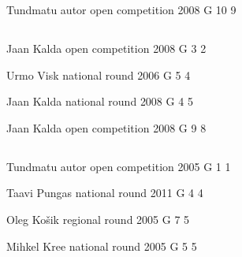 \documentclass[11pt]{article}
\begin{document}
\ylDisplay{} %
{Tundmatu autor} %
{open competition} %
{2008} %
{G 10} %
{9} %
{

\ifEngStatement
\fi
}
\newpage\subsection{\protect{}}

\ylDisplay{} %
{Jaan Kalda} %
{open competition} %
{2008} %
{G 3} %
{2} %
{

\ifEngStatement
\fi
}

\ylDisplay{} %
{Urmo Visk} %
{national round} %
{2006} %
{G 5} %
{4} %
{

\ifEngStatement
\fi
}

\ylDisplay{} %
{Jaan Kalda} %
{national round} %
{2008} %
{G 4} %
{5} %
{

\ifEngStatement
\fi
}

\ylDisplay{} %
{Jaan Kalda} %
{open competition} %
{2008} %
{G 9} %
{8} %
{

\ifEngStatement
\fi
}
\newpage\subsection{\protect{}}

\ylDisplay{} %
{Tundmatu autor} %
{open competition} %
{2005} %
{G 1} %
{1} %
{

\ifEngStatement
\fi
}

\ylDisplay{} %
{Taavi Pungas} %
{national round} %
{2011} %
{G 4} %
{4} %
{

\ifEngStatement
\fi
}

\ylDisplay{} %
{Oleg Košik} %
{regional round} %
{2005} %
{G 7} %
{5} %
{

\ifEngStatement
\fi
}

\ylDisplay{} %
{Mihkel Kree} %
{national round} %
{2005} %
{G 5} %
{5} %
{

\ifEngStatement
\fi
}
\end{document}
